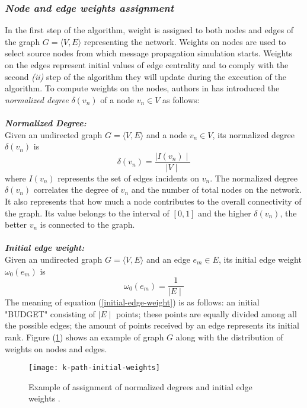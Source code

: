 \subsubsection*{\textit{Node and edge weights assignment}}
In the first step of the algorithm, weight is assigned to both nodes and edges of the graph $G = \langle V, E \rangle$ representing the network. Weights on nodes are used to select source nodes from which message propagation simulation starts. Weights on the edges represent initial values of edge centrality and to comply with the second \textit{(ii)} step of the algorithm they will update during the execution of the algorithm. To compute weights on the nodes, authors in  \cite{ref-35} has introduced the \textit{normalized degree} $\delta(v_n)$ of a node $v_n \in V$ as follows:\\\\
\textbf{\textit{Normalized Degree:}}\\
Given an undirected graph $G = \langle V, E \rangle$ and a node $v_n \in V$, its normalized degree $\delta(v_n)$ is
\begin{equation}\label{k-path-normalized-degree}
\delta (v_n) = \dfrac{\mid I(v_n) \mid}{\mid V \mid}
\end{equation}
where $I(v_n)$ represents the set of edges incidents on $v_n$. The normalized degree $\delta(v_n)$ correlates the degree of $v_n$ and the number of total nodes on the network. It also represents that how much a node contributes to the overall connectivity of the graph. Its value belongs to the interval of $\left[0,1\right]$ and the higher $\delta (v_n)$, the better $v_n$ is connected to the graph.\\\\
\textbf{\textit{Initial edge weight:}}\\
Given an undirected graph $G = \langle V, E \rangle$ and an edge $e_m \in E$, its initial edge weight $\omega_0 (e_m)$ is
\begin{equation}\label{initial-edge-weight}
\omega_0(e_m) = \dfrac{1}{\mid E \mid}
\end{equation}
The meaning of equation (\ref{initial-edge-weight}) is as follows: an initial "BUDGET" consisting of $\mid E \mid$ points; these points are equally divided among all the possible edges; the amount of points received by an edge represents its initial rank. Figure (\ref{fig:initial-edge-weight-graph}) shows an example of graph $G$ along with the distribution of weights on nodes and edges.
\begin{figure}[!ht]
	\centering
	\texttt{[image: k-path-initial-weights]}
	\caption{Example of assignment of normalized degrees and initial edge weights \cite{ref-35}.}
	\label{fig:initial-edge-weight-graph}
\end{figure}

